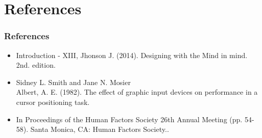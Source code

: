 \documentclass[11pt]{beamer}
\begin{document}
    \section{References}
    \begin{frame}
    \frametitle{References}
    \begin{itemize}
    \item Introduction - XIII, Jhonson J. (2014). Designing with the Mind in mind. 2nd. edition.
    \item Sidney L. Smith and Jane N. Mosier \\
    Albert, A. E. (1982). The effect of graphic input devices on performance in a cursor positioning task. 
    
    \item In Proceedings of the Human Factors Society 26th Annual Meeting (pp. 54-58). Santa Monica, CA: Human Factors Society..
    \end{itemize}
    \end{frame}
\end{document}
